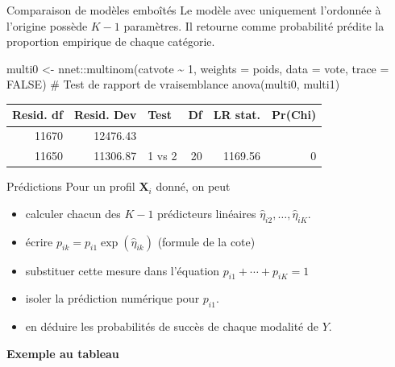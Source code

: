 \documentclass[
  ignorenonframetext,
]{beamer}
\newenvironment{Shaded}{\begin{snugshade}}{\end{snugshade}}
\newcommand{\AttributeTok}[1]{\textcolor[rgb]{0.40,0.45,0.13}{#1}}
\newcommand{\CommentTok}[1]{\textcolor[rgb]{0.37,0.37,0.37}{#1}}
\newcommand{\ConstantTok}[1]{\textcolor[rgb]{0.56,0.35,0.01}{#1}}
\newcommand{\DecValTok}[1]{\textcolor[rgb]{0.68,0.00,0.00}{#1}}
\newcommand{\FunctionTok}[1]{\textcolor[rgb]{0.28,0.35,0.67}{#1}}
\newcommand{\NormalTok}[1]{\textcolor[rgb]{0.00,0.23,0.31}{#1}}
\newcommand{\OtherTok}[1]{\textcolor[rgb]{0.00,0.23,0.31}{#1}}
\newcommand{\SpecialCharTok}[1]{\textcolor[rgb]{0.37,0.37,0.37}{#1}}
\providecommand{\tightlist}{%
  \setlength{\itemsep}{0pt}\setlength{\parskip}{0pt}}\usepackage{longtable,booktabs,array}
\begin{document}
\begin{frame}[fragile]{Comparaison de modèles emboîtés}
\protect\hypertarget{comparaison-de-moduxe8les-embouxeetuxe9s}{}
Le modèle avec uniquement l'ordonnée à l'origine possède \(K-1\)
paramètres. Il retourne comme probabilité prédite la proportion
empirique de chaque catégorie.

\begin{Shaded}
\begin{Highlighting}[numbers=left,,]
\NormalTok{multi0 }\OtherTok{\textless{}{-}}\NormalTok{ nnet}\SpecialCharTok{::}\FunctionTok{multinom}\NormalTok{(catvote }\SpecialCharTok{\textasciitilde{}} \DecValTok{1}\NormalTok{,}
                         \AttributeTok{weights =}\NormalTok{ poids,}
                         \AttributeTok{data =}\NormalTok{ vote,}
                         \AttributeTok{trace =} \ConstantTok{FALSE}\NormalTok{)}
\CommentTok{\# Test de rapport de vraisemblance}
\FunctionTok{anova}\NormalTok{(multi0, multi1)}
\end{Highlighting}
\end{Shaded}

\begin{longtable}[]{@{}rrlrrr@{}}
\toprule()
Resid. df & Resid. Dev & Test & Df & LR stat. & Pr(Chi) \\
\midrule()
\endhead
11670 & 12476.43 & & & & \\
11650 & 11306.87 & 1 vs 2 & 20 & 1169.56 & 0 \\
\bottomrule()
\end{longtable}
\end{frame}

\begin{frame}{Prédictions}
\protect\hypertarget{pruxe9dictions}{}
Pour un profil \(\mathbf{X}_i\) donné, on peut

\begin{itemize}
\tightlist
\item
  calculer chacun des \(K-1\) prédicteurs linéaires
  \(\widehat{\eta}_{i2}, \ldots, \widehat{\eta}_{iK}\).
\item
  écrire \(p_{ik} = p_{i1}\exp(\widehat{\eta}_{ik})\) (formule de la
  cote)
\item
  substituer cette mesure dans l'équation \(p_{i1} + \cdots + p_{iK}=1\)
\item
  isoler la prédiction numérique pour \(p_{i1}\).
\item
  en déduire les probabilités de succès de chaque modalité de \(Y\).
\end{itemize}

\textbf{Exemple au tableau}
\end{frame}
\end{document}
